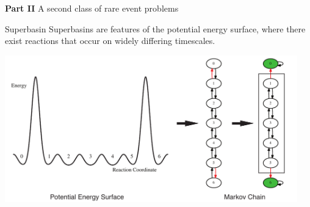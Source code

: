 \documentclass[onlymath]{beamer}
\begin{document}
\begin{frame}{\textbf{Part II} A second class of rare event problems}
  \begin{block}{Superbasin}
    Superbasins are features of the potential energy surface, where there exist reactions that occur on widely differing timescales.
  \end{block}

  \begin{center}
    \includegraphics[width=0.95\textwidth]{images/superbasin-and-graphs}
  \end{center}


\end{frame}
\end{document}
